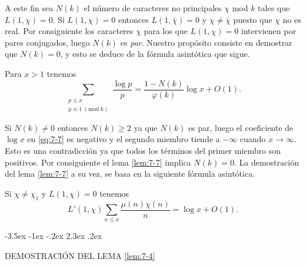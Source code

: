 \documentclass[12pt,a4paper]{book}
\makeatletter
\renewcommand\section{\@startsection{section}{1}{\z@}%
  {-3.5ex \@plus -1ex \@minus -.2ex}%
  {2.3ex \@plus .2ex}%
  {\normalfont\Large\bfseries\raggedright}}
\makeatother
\begin{document}
    A este fin sea $N(k)$ el número de caracteres no principales $\chi$ mod $k$ tales que
    $L(1,\chi)=0$. Si $L(1,\chi)=0$ entonces $L(1,\bar{\chi})=0$ y $\chi\neq\bar{\chi}$
    puesto que $\chi$ no es real. Por consiguiente los caracteres $\chi$ para los que
    $L(1,\chi)=0$ intervienen por pares conjugados, luego $N(k)$ es \textit{par}. Nuestro
    propósito consiste en demostrar que $N(k)=0$, y esto se deduce de la fórmula asintótica
    que sigue.

    \begin{lema}\label{lem:7-7}
        Para $x>1$ tenemos
        \begin{equation}\label{eq:7-7}
            \sum_{\substack{p\leq x\\p\equiv1\ (\mathrm{mod}\ k)}}\frac{\log p}{p}
            =\frac{1-N(k)}{\varphi(k)}\log x+O(1).
        \end{equation}
    \end{lema}

    Si $N(k)\neq0$ entonces $N(k)\geq2$ ya que $N(k)$ es par, luego el coeficiente de
    $\log x$ en \eqref{eq:7-7} es negativo y el segundo miembro tiende a $-\infty$ cuando
    $x\to\infty$. Esto es una contradicción ya que todos los términos del primer miembro
    son positivos. Por consiguiente el lema \ref{lem:7-7} implica $N(k)=0$. La
    demostración del lema \ref{lem:7-7} a su vez, se basa en la siguiente fórmula
    asintótica.

    \begin{lema}\label{lem:7-8}
        Si $\chi\neq\chi_{1}$ y $L(1,\chi)=0$ tenemos
        \begin{equation*}
            L'(1,\chi)\sum_{n\leq x}\frac{\mu(n)\chi(n)}{n}=\log x+O(1).
        \end{equation*}
    \end{lema}

    \section{DEMOSTRACIÓN DEL LEMA \ref{lem:7-4}}
\end{document}
